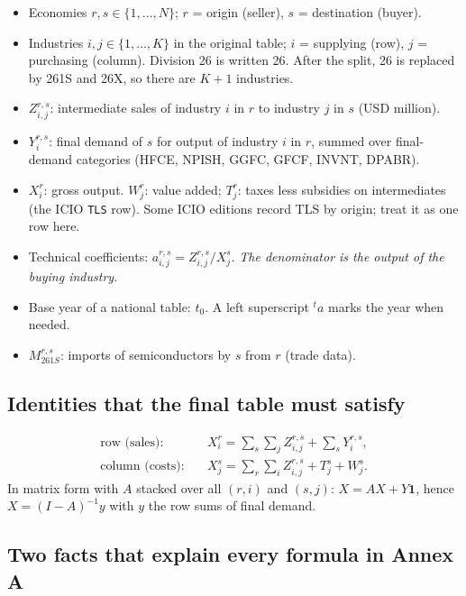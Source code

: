 \documentclass[11pt,a4paper]{article}
\theoremstyle{remark}
\theoremstyle{definition}
\newcommand{\sem}{{261S}}   %
\newcommand{\oth}{{26X}}    %
\newcommand{\agg}{{26}}     %
\begin{document}
\begin{itemize}[nosep]
  \item Economies $r,s \in \{1,\dots,N\}$; $r$ = origin (seller), $s$ = destination (buyer).
  \item Industries $i,j \in \{1,\dots,K\}$ in the original table; $i$ = supplying (row), $j$ = purchasing (column).
        Division 26 is written \agg. After the split, \agg{} is replaced by \sem{} and \oth, so there are $K+1$ industries.
  \item $Z^{r,s}_{i,j}$: intermediate sales of industry $i$ in $r$ to industry $j$ in $s$ (USD million).
  \item $Y^{r,s}_{i}$: final demand of $s$ for output of industry $i$ in $r$, summed over final-demand
        categories (HFCE, NPISH, GGFC, GFCF, INVNT, DPABR).
  \item $X^r_i$: gross output. $W^r_j$: value added; $T^r_j$: taxes less subsidies on intermediates
        (the ICIO \texttt{TLS} row). Some ICIO editions record TLS by origin; treat it as one row here.
  \item Technical coefficients: $a^{r,s}_{i,j} = Z^{r,s}_{i,j} / X^s_j$.
        \emph{The denominator is the output of the buying industry.}
  \item Base year of a national table: $t_0$. A left superscript ${}^{t}a$ marks the year when needed.
  \item $M^{r,s}_\sem$: imports of semiconductors by $s$ from $r$ (trade data).
\end{itemize}

\subsection{Identities that the final table must satisfy}
\begin{align}
  \text{row (sales):}\quad & X^r_i = \sum_{s}\sum_j Z^{r,s}_{i,j} + \sum_s Y^{r,s}_i, \label{eq:row}\\
  \text{column (costs):}\quad & X^s_j = \sum_r\sum_i Z^{r,s}_{i,j} + T^s_j + W^s_j. \label{eq:col}
\end{align}
In matrix form with $A$ stacked over all $(r,i)$ and $(s,j)$: $X = AX + Y\mathbf 1$, hence $X = (I-A)^{-1}y$ with
$y$ the row sums of final demand.

\subsection{Two facts that explain every formula in Annex A}
\end{document}

